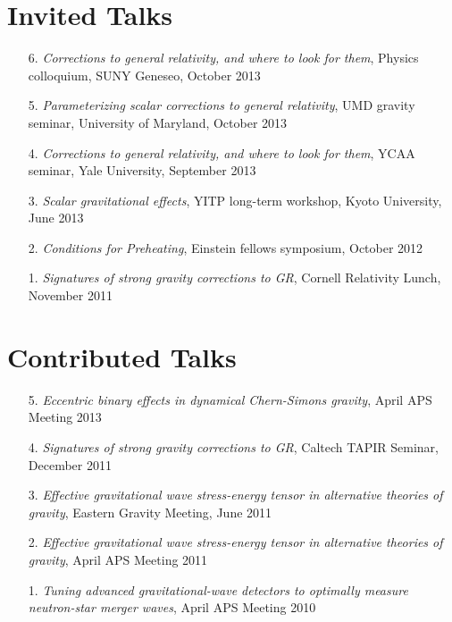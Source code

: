 \section{\sc Invited Talks}
\begin{enumerate}
\item[{6.}] {\it Corrections to general relativity, and where to look for them},
  Physics colloquium, SUNY Geneseo, October 2013
\item[{5.}] {\it Parameterizing scalar corrections to general relativity}, UMD gravity seminar,
 University of Maryland, October 2013
\item[{4.}] {\it Corrections to general relativity, and where to look for them},
  YCAA seminar, Yale University, September 2013
\item[{3.}] {\it Scalar gravitational effects}, YITP long-term
  workshop, Kyoto University, June 2013
\item[{2.}] {\it Conditions for Preheating},
  Einstein fellows symposium, October 2012
\item[{1.}] {\it Signatures of strong gravity corrections to GR},
  Cornell Relativity Lunch, November 2011
\end{enumerate}

\section{\sc Contributed Talks}
\begin{enumerate}
\item[{5.}] {\it Eccentric binary effects in dynamical Chern-Simons gravity},
  April APS Meeting 2013
\item[{4.}] {\it Signatures of strong gravity corrections to GR},
  Caltech TAPIR Seminar, December 2011
\item[{3.}] {\it Effective gravitational wave stress-energy tensor in
    alternative theories of gravity}, Eastern Gravity Meeting, June 2011
\item[{2.}] {\it Effective gravitational wave stress-energy tensor in alternative theories of gravity}, April APS Meeting 2011
\item[{1.}] {\it Tuning advanced gravitational-wave detectors to
    optimally measure neutron-star merger waves}, April APS Meeting 2010
\end{enumerate}


